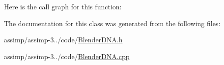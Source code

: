 Here is the call graph for this function\+:




The documentation for this class was generated from the following files\+:\begin{DoxyCompactItemize}
\item 
assimp/assimp-\/3../code/\hyperlink{_blender_d_n_a_8h}{Blender\+D\+N\+A.\+h}\item 
assimp/assimp-\/3../code/\hyperlink{_blender_d_n_a_8cpp}{Blender\+D\+N\+A.\+cpp}\end{DoxyCompactItemize}
